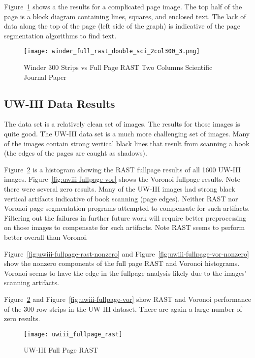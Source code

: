 \documentclass[conference]{IEEEtran}
\begin{document}
Figure~\ref{fig:winder-300-double-pic-sci-2col300} shows a the results for a
complicated page image. The top half of the page is a block diagram containing
lines, squares, and enclosed text. The lack of data along the top of the page
(left side of the graph) is indicative of the page segmentation algorithms to
find text.

\begin{figure}[winder-300-double-pic-sci-2col300]
\texttt{[image: winder\_full\_rast\_double\_sci\_2col300\_3.png]}
\caption{Winder 300 Strips vs Full Page RAST Two Columns Scientific Journal Paper}
\label{fig:winder-300-double-pic-sci-2col300}
\end{figure}


%
%
\subsection{UW-III Data Results}

The \cite{IEEEhowto:Winder} data set is a relatively clean set of images. The results for
those images is quite good. The UW-III data set is a much more challenging set
of images. Many of the images contain strong vertical black lines that result
from scanning a book (the edges of the pages are caught as shadows). 

Figure~\ref{fig:uwiii-fullpage-rast} is a histogram showing the RAST fullpage results of
all 1600 UW-III images.  Figure~\ref{fig:uwiii-fullpage-vor} shows the Voronoi
fullpage results. Note there were several zero results. Many of the UW-III
images had strong black vertical artifacts indicative of book scanning (page
edges). Neither RAST nor Voronoi page segmentation programs
attempted to compensate for such artifacts. Filtering out the failures in
further future work will require better preprocessing on those images to
compensate for such artifacts. Note RAST seems to perform better overall than
Voronoi.

Figure~\ref{fig:uwiii-fullpage-rast-nonzero} and
Figure~\ref{fig:uwiii-fullpage-vor-nonzero} show the nonzero components of the
full page RAST and Voronoi histograms.  Voronoi seems to have the edge in the
fullpage analysis likely due to the images' scanning artifacts.

Figure~\ref{fig:uwiii-fullpage-rast} and Figure~\ref{fig:uwiii-fullpage-vor}
show RAST and Voronoi performance of the 300 row strips in the UW-III
dataset. There are again a large number of zero results. 


\begin{figure}[uwiii-fullpage-rast]
\texttt{[image: uwiii\_fullpage\_rast]}
\caption{UW-III Full Page RAST}
\label{fig:uwiii-fullpage-rast}
\end{figure}
\end{document}
